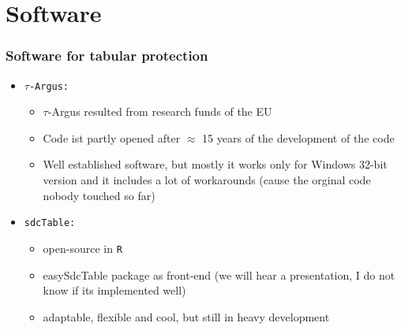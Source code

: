 \section{Software}
\begin{frame}\frametitle{Software for tabular protection}
	\begin{itemize}
	  \item {\tt $\tau$-Argus:}
	  \begin{itemize}
	    \item $\tau$-Argus resulted from research funds of the EU \pause
	  	\item Code ist partly opened after $\approx$ 15 years of the development of the code
	  	\pause
	  	\item Well established software, but mostly it works only for Windows 32-bit version and it includes a lot of workarounds
	  	(cause the orginal code nobody touched so far) 
	  	\pause
	  \end{itemize}
	  \item {\tt sdcTable:}
	  \begin{itemize}
	    \item open-source in {\tt R} \pause
	  	\item easySdcTable package as front-end (we will hear a presentation, I do not know if its implemented well) \pause
	  	\item adaptable, flexible and cool, but still in heavy development \pause
	  \end{itemize}
	\end{itemize}
\end{frame}



